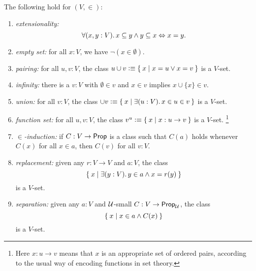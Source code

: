 \begin{thm}\label{thm:VisCST}
  The following hold for $(V, {\in})$:
  \begin{enumerate}
  \item \emph{extensionality:}
    \begin{equation*}
      \fall{x, y : V} x \subseteq y \land y \subseteq x \Leftrightarrow x = y.
    \end{equation*}
     \item \emph{empty set:} for all $x:V$, we have $\neg (x\in \emptyset)$.
    \item \emph{pairing:} for all $u, v:V$, the class $u\cup v \vcentcolon\equiv \Set{ x | x = u \vee x = v}$ is a $V$-set.
    \item \emph{infinity:}  there is a $v:V$ with $\emptyset\in v$ and $x\in v$ implies $x\cup \{x\}\in v$.
  \item \emph{union:} for all $v:V$, the class $\cup v\defeq \setof{ x | \exis{u:V} x \in u \in v}$ is a $V$-set.
    \item \emph{function set:} for all $u, v:V$, the class $v^u \vcentcolon\equiv \Set{ x | x : u\to v}$ is a $V$-set.%
      \footnote{Here $x:u\to v$ means that $x$ is an appropriate set of ordered pairs, according to the usual way of encoding functions in set theory.}
   \item \emph{$\in$-induction:} if $C : V \to \mathsf{Prop}$ is a class such that $C(a)$ holds whenever $C(x)$ for all $x\in a$, then $C(v)$ for all $v:V$.
     \item \emph{replacement:} given any $r : V \to V$ and $a : V$, the class 
       \begin{equation*}
         \setof{ x | \exis{y : V} y \in a \land x = r(y)}
       \end{equation*}
       is a $V$-set.
   \item \emph{separation:}  given any $a : V$ and $\mathcal{U}$-small $C : V \to \mathsf{Prop}_\mathcal{U}$, the class
     \begin{equation*}
       \Set{ x | x \in a \land C(x)}
     \end{equation*}
     is a $V$-set.
  \end{enumerate}
\end{thm}


